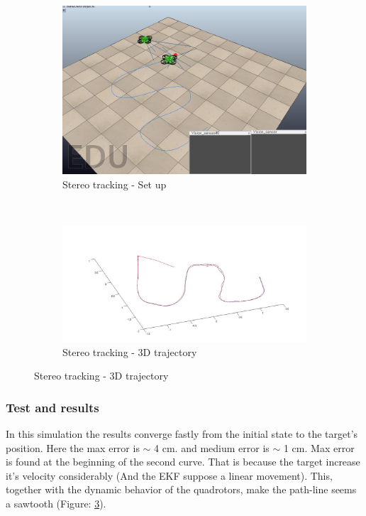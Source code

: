 \begin{figure}[h]
	\centering
	\begin{subfigure}[b]{0.4\linewidth}
	\centering
		\includegraphics[width=\linewidth]{../Images/c3/sim3_set_up}
		\caption{Stereo tracking - Set up}
		\label{fig:sim3_set_up}
	\end{subfigure}
	~
	\begin{subfigure}[b]{0.4\linewidth}
		\centering
		\includegraphics[width=\linewidth]{../Images/c3/sim3_traj_both_3d}
		\caption{Stereo tracking - 3D trajectory}
		\label{fig:sim3_traj_both_3d}
	\end{subfigure}
\end{figure}

\subsubsection{Test and results}

	In this simulation the results converge fastly from the initial state to the target's position. Here the max error is $\sim$ 4 cm. and medium error is $\sim$ 1 cm. Max error is found at the beginning of the second curve. That is because the target increase it's velocity considerably (And the EKF suppose a linear movement). This, together with the dynamic behavior of the quadrotors, make the path-line seems a sawtooth (Figure: \ref{fig:sim3_traj_both_3d}).
	
